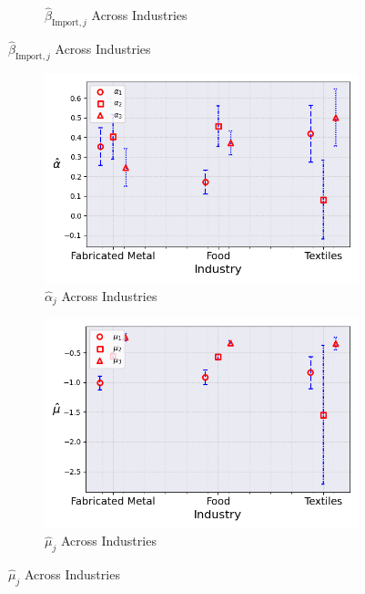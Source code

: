 \documentclass{article}
\begin{document}
\begin{figure}[ht!]
\begin{subfigure}[t]{0.32\textwidth}
        \caption{$\hat{\beta}_{\text{Import},j}$ Across Industries}
    \end{subfigure}
\end{figure}

\begin{figure}[ht!]
    \centering 
    \caption{Stationary Normal Model Across Industries ($\hat{M}_0 = 3$)}
    \begin{subfigure}[t]{0.32\textwidth}
        \centering
        \includegraphics[width=\textwidth]{figure/stationary_normal_alpha_across_industries_m3.png}
        \caption{$\hat\alpha_j$ Across Industries}
    \end{subfigure}
    \begin{subfigure}[t]{0.32\textwidth}
        \centering
        \includegraphics[width=\textwidth]{figure/stationary_normal_mu_across_industries_m3.png}
        \caption{$\hat\mu_j$ Across Industries}

\end{subfigure}
\end{figure}
\end{document}
